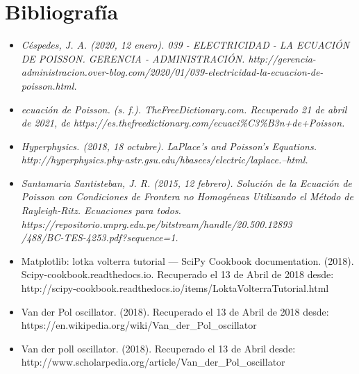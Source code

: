 \documentclass[12pt]{article}
\begin{document}
\section*{Bibliografía}
\begin{itemize}

\item \textit{Céspedes, J. A. (2020, 12 enero). 039 - ELECTRICIDAD - LA ECUACIÓN DE POISSON. GERENCIA - ADMINISTRACIÓN. http://gerencia-administracion.over-blog.com/2020/01/039-electricidad-la-ecuacion-de-poisson.html.}

\item \textit{ecuación de Poisson. (s. f.). TheFreeDictionary.com. Recuperado 21 de abril de 2021, de https://es.thefreedictionary.com/ecuaci\%C3\%B3n+de+Poisson.}

\item \textit{Hyperphysics. (2018, 18 octubre). LaPlace’s and Poisson’s Equations.\\ http://hyperphysics.phy-astr.gsu.edu/hbasees/electric/laplace.--html.}

\item \textit{Santamaria Santisteban, J. R. (2015, 12 febrero). Solución de la Ecuación de Poisson con Condiciones de Frontera no Homogéneas Utilizando el Método de Rayleigh-Ritz. Ecuaciones para todos.\\ https://repositorio.unprg.edu.pe/bitstream/handle/20.500.12893\\/488/BC-TES-4253.pdf?sequence=1.}

\item Matplotlib: lotka volterra tutorial — SciPy Cookbook documentation. (2018). Scipy-cookbook.readthedocs.io. 
Recuperado el 13 de Abril de 2018 desde:\\
http://scipy-cookbook.readthedocs.io/items/LoktaVolterraTutorial.html

\item Van der Pol oscillator. (2018). Recuperado el 13 de Abril de 2018 desde:\\ https://en.wikipedia.org/wiki/Van\_der\_Pol\_oscillator

\item Van der poll oscillator. (2018). Recuperado el 13 de Abril desde: \\
http://www.scholarpedia.org/article/Van\_der\_Pol\_oscillator

\end{itemize}


\end{document}
